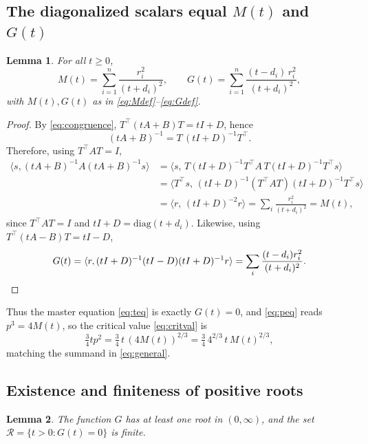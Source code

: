 \documentclass{amsart}
\newtheorem{lemma}{Lemma}
\theoremstyle{definition}
\begin{document}
\subsection{The diagonalized scalars equal \texorpdfstring{$M(t)$ and $G(t)$}{M and G}}

\begin{lemma}\label{lem:identities}
For all $t\ge0$,
\[
M(t)=\sum_{i=1}^n\frac{r_i^2}{(t+d_i)^2},\qquad
G(t)=\sum_{i=1}^n\frac{(t-d_i)\,r_i^2}{(t+d_i)^2},
\]
with $M(t),G(t)$ as in \eqref{eq:Mdef}--\eqref{eq:Gdef}.
\end{lemma}

\begin{proof}
By \eqref{eq:congruence}, $T^\top(tA+B)T=tI+D$, hence
\[
(tA+B)^{-1}=T\,(tI+D)^{-1}T^\top .
\]
Therefore, using $T^\top A T=I$,
\begin{align*}
\langle s,(tA+B)^{-1}A(tA+B)^{-1}s\rangle
&=\langle s,\,T(tI+D)^{-1}T^\top A\,T(tI+D)^{-1}T^\top s\rangle\\
&=\langle T^\top s,\,(tI+D)^{-1}(T^\top A T)(tI+D)^{-1}T^\top s\rangle\\
&=\langle r,\,(tI+D)^{-2}r\rangle=\sum_i\frac{r_i^2}{(t+d_i)^2}=M(t),
\end{align*}
since $T^\top A T=I$ and $tI+D=\mathrm{diag}(t+d_i)$. Likewise, using $T^\top(tA-B)T=tI-D$,
\[
G(t)=\langle r,(tI+D)^{-1}(tI-D)(tI+D)^{-1}r\rangle=\sum_i\frac{(t-d_i)r_i^2}{(t+d_i)^2}.\qedhere
\]
\end{proof}

Thus the master equation \eqref{eq:teq} is exactly $G(t)=0$, and \eqref{eq:peq} reads $p^3=4M(t)$, so the critical value \eqref{eq:critval} is
\begin{equation}\label{eq:Vt}
\tfrac34 t p^2=\tfrac34\,t\,(4M(t))^{2/3}=\tfrac34\,4^{2/3}\,t\,M(t)^{2/3},
\end{equation}
matching the summand in \eqref{eq:general}.

\subsection{Existence and finiteness of positive roots}

\begin{lemma}\label{lem:rootexist}
The function $G$ has at least one root in $(0,\infty)$, and the set $\mathcal R=\{t>0:G(t)=0\}$ is finite.
\end{lemma}
\end{document}
